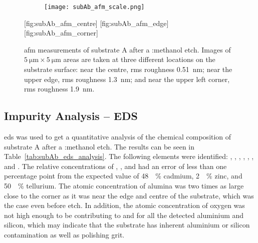 \begin{figure}[htbp]
    \centering
    \begin{subfigure}[c]{0.032\linewidth}
        \label{fig:subAb_afm_scale}\captionsetup{list=no}
        \texttt{[image: subAb\_afm\_scale.png]}
    \end{subfigure}
    \hfill
    [fig:subAb_afm_centre] %
    \hfill
    [fig:subAb_afm_edge] %
    \hfill
    [fig:subAb_afm_corner]%
    \caption[\Ac{afm} of substrate A after a :methanol etch.]{\Ac{afm} measurements of substrate A after a :methanol etch. Images of $\SI{5}{\micro\metre}\times\SI{5}{\micro\metre}$ areas are taken at three different locations on the substrate surface:  near the centre, \ac{rms} roughness \SI{0.51}{\nano\metre};  near the upper edge, \ac{rms} roughness \SI{1.3}{\nano\metre}; and  near the upper left corner, \ac{rms} roughness \SI{1.9}{\nano\metre}.}\label{fig:subAb_afm}
\end{figure} %

\subsection{Impurity Analysis -- EDS}
\Ac{eds} was used to get a quantitative analysis of the chemical composition of substrate A after a :methanol etch. The results can be seen in Table~\ref{tab:subAb_eds_analysis}. The following elements were identified: , , , , , , and . The relative concentrations of , , and  had an error of less than one percentage point from the expected value of \SI{48}{\atomic\percent} cadmium, \SI{2}{\atomic\percent} zinc, and \SI{50}{\atomic\percent} tellurium. The atomic concentration of alumina was two times as large close to the corner as it was near the edge and centre of the substrate, which was the case even before etch. In addition, the atomic concentration of oxygen was not high enough to be contributing to  and  for all the detected aluminium and silicon, which may indicate that the substrate has inherent aluminium or silicon contamination as well as polishing grit.

